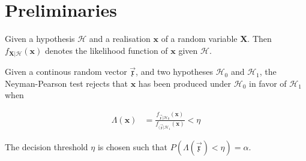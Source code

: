 \documentclass[a4paper, openany, oneside]{memoir}
\begin{document}
\section{Preliminaries}




\begin{blockDefinition}
Given a hypothesis $\mathcal{H}$ and a realisation $\mathbf{x}$ of a random variable $\mathbf{X}$. Then $f_{\mathbf{X} | \mathcal{H}}(\mathbf{x})$ denotes the likelihood function of $\mathbf{x}$ given $\mathcal{H}$.
\end{blockDefinition}

\begin{blockDefinition}
Given a continous random vector $\vec{\mathfrak{x}}$, and two hypotheses $\mathcal{H}_0$ and $\mathcal{H}_1$, the Neyman-Pearson test rejects that $\mathbf{x}$ has been produced under $\mathcal{H}_0$ in favor of $\mathcal{H}_1$ when

\begin{align*}
    \Lambda (\mathbf{x}) &= \frac{f_{\vec{\mathfrak{x}} | \mathcal{H}_0} (\mathbf{x})}{f_{(\vec{\mathfrak{x}} | \mathcal{H}_1}(\mathbf{x})} < \eta 
\end{align*}

The decision threshold $\eta$ is chosen such that $P(\Lambda(\vec{\mathfrak{x}}) < \eta) = \alpha$.
\end{blockDefinition}
\end{document}
